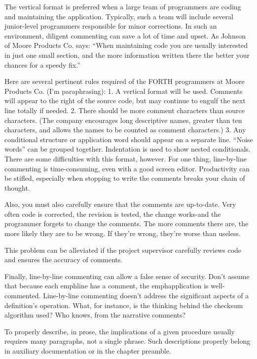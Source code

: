 The vertical format is preferred when a large team of programmers are
coding and maintaining the application.  Typically, such a team will include
several junior-level programmers responsible for minor corrections.
In such an environment, diligent commenting can save a lot of time and
upset.  As Johnson of Moore Products Co. says: ``When maintaining code
you are usually interested in just one small section, and the more information
written there the better your chances for a speedy fix.''

Here are several pertinent rules required of the FORTH programmers
at Moore Products Co. (I'm paraphrasing):
1. A vertical format will be used.  Comments will appear to the right of the
source code, but may continue to engulf the next line totally if needed.
2. There should be more comment characters than source characters.  (The
company encourages long descriptive names, greater than ten characters,
and allows the names to be counted as comment characters.)
3. Any conditional structure or application word should appear on a separate
line.  ``Noise words'' can be grouped together.  Indentation is used to show
nested conditionals.
There are some difficulties with this format, however.  For one thing, line-by-line
commenting is time-consuming, even with a good screen editor.
Productivity can be stifled, especially when stopping to write the comments
breaks your chain of thought.

Also, you must also carefully ensure that the comments are up-to-date.
Very often code is corrected, the revision is tested, the change
works-and the programmer forgets to change the comments.  The more
comments there are, the more likely they are to be wrong.  If they're
wrong, they're worse than useless.

This problem can be alleviated if the project supervisor carefully reviews
code and ensures the accuracy of comments.

Finally, line-by-line commenting can allow a false sense of security.
Don't assume that because each emph{line} has a comment, the emph{application} is
well-commented.  Line-by-line commenting doesn't address the significant
aspects of a definition's operation.  What, for instance, is the thinking
behind the checksum algorithm used? Who knows, from the narrative
comments?

To properly describe, in prose, the implications of a given procedure
usually requires many paragraphs, not a single phrase.  Such descriptions
properly belong in auxiliary documentation or in the chapter preamble.

